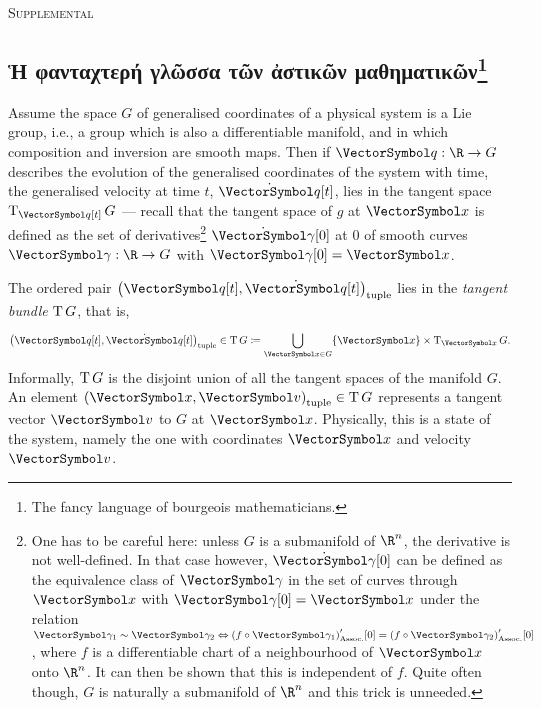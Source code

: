 \documentclass[10pt]{article}
\newcommand{\Rn}{{\R^n}}
\newenvironment{supplemental}{
\begin{flushright}
\textsc{Supplemental}
\end{flushright}}{}
\begin{document}
\begin{supplemental}
\subsection{\textgreek{Ἡ φανταχτερή γλῶσσα τῶν ἀστικῶν μαθηματικῶν}\footnote{The fancy language of bourgeois mathematicians.}}
\begingroup
\newcommand{\VelocitySpace}{\LieAlgebraSymbol{g}}
\newcommand{\MomentumSpace}{\Dual\VelocitySpace}
\newcommand{\Lagrangian}{\mathscr{L}}
\newcommand{\Hamiltonian}{\mathscr{H}}
\newcommand{\eqrel}{\sim}
Assume the space $G$ of generalised coordinates of a physical system is a Lie group, i.e., a group which is also a differentiable manifold, and in which composition and inversion are smooth maps. Then if $\FunctionSpec\vq \R G$ describes the evolution of the generalised coordinates of the system with time, the generalised velocity at time $t$, $\TimeDerivative\vq\of t$, lies in the tangent space $\TangentSpace{\vq\of t}G$ --- recall that the tangent space of $g$ at $\vx$ is defined as the set of derivatives\footnote{One has to be careful here: unless $G$ is a submanifold of $\Rn$, the derivative is not well-defined. In that case however, $\TimeDerivative \vgg\of 0$ can be defined as the equivalence class of $\vgg$ in the set of curves through $\vx$ with $\vgg\of 0 = \vx$ under the relation $\vgg_1\eqrel\vgg_2 \Equivalent \pa{f\Compose\vgg_1}\der\of 0 = \pa{f\Compose\vgg_2}\der\of 0$, where $f$ is a differentiable chart of a neighbourhood of $\vx$ onto $\Rn$. It can then be shown that this is independent of $f$. Quite often though, $G$ is naturally a submanifold of $\Rn$ and this trick is unneeded.} $\TimeDerivative \vgg\of 0$ at $0$ of smooth curves $\FunctionSpec\vgg\R G$ with $\vgg\of 0 = \vx$.

The ordered pair $\tuple{\vq\of t,\TimeDerivative\vq\of t}$ lies in the \emph{tangent bundle} $\operatorname{T}{G}$, that is,
\begin{equation*}
\tuple{\vq\of t,\TimeDerivative\vq\of t} \in \TangentBundle G \DefineAs \UnionOver{\vx \in G} \set{\vx} \Cartesian \TangentSpace{\vx}G.
\end{equation*}
Informally, $\operatorname{T}{G}$ is the disjoint union of all the tangent spaces of the manifold $G$. An element $\tuple{\vx,\vv}\in \TangentBundle G$  represents a tangent vector $\vv$ to $G$ at $\vx$. Physically, this is a state of the system, namely the one with coordinates $\vx$ and velocity $\vv$. 


\end{supplemental}
\end{document}
